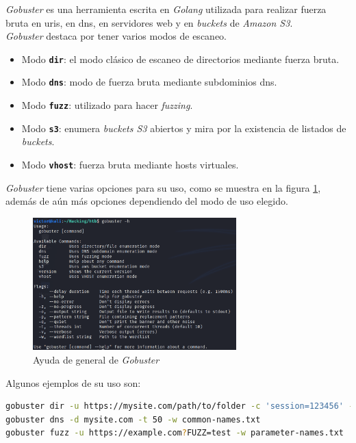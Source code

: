 \textit{Gobuster}\cite{gobuster} es una herramienta escrita en \textit{Golang} utilizada para realizar fuerza bruta en \acrshort{uri}s, en \acrshort{dns}, en servidores web y en \textit{buckets} de \textit{Amazon S3}.\\

\textit{Gobuster} destaca por tener varios modos de escaneo.

\begin{itemize}
    \item Modo \texttt{\textbf{dir}}: el modo clásico de escaneo de directorios mediante fuerza bruta.
    \item Modo \texttt{\textbf{dns}}: modo de fuerza bruta mediante subdominios \acrshort{dns}.
    \item Modo \texttt{\textbf{fuzz}}: utilizado para hacer \textit{fuzzing}.
    \item Modo \texttt{\textbf{s3}}: enumera \textit{buckets S3} abiertos y mira por la existencia de listados de \textit{buckets}.
    \item Modo \texttt{\textbf{vhost}}: fuerza bruta mediante hosts virtuales.
\end{itemize}

\textit{Gobuster} tiene varias opciones para su uso, como se muestra en la figura \ref{fig:gobuster-help}, además de aún más opciones dependiendo del modo de uso elegido.\\

\begin{figure}[h]
    \centering
    \includegraphics[width=0.7\textwidth]{images/sections/tools/gobuster.png}
    \caption{Ayuda de general de \textit{Gobuster}}
    \label{fig:gobuster-help}
\end{figure}

Algunos ejemplos de su uso son:

\begin{lstlisting}[language=bash]
gobuster dir -u https://mysite.com/path/to/folder -c 'session=123456' -t 50 -w common-files.txt -x .php,.html
gobuster dns -d mysite.com -t 50 -w common-names.txt
gobuster fuzz -u https://example.com?FUZZ=test -w parameter-names.txt
\end{lstlisting}